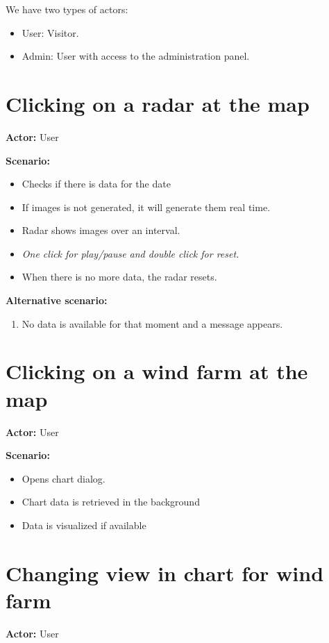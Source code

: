 We have two types of actors:
\begin{itemize}
\item User: Visitor.
\item Admin: User with access to the administration panel.
\end{itemize}

\section{Clicking on a radar at the map}
\textbf{Actor:} User

\textbf{Scenario:}
\begin{itemize}
\item Checks if there is data for the date
\item If images is not generated, it will generate them real time.
\item Radar shows images over an interval.
\item \emph{One click for play/pause and double click for reset.}
\item When there is no more data, the radar resets.
\end{itemize}
\textbf{Alternative scenario:} 
\begin{enumerate}
\item No data is available for that moment and a message appears.
\end{enumerate}

\section{Clicking on a wind farm at the map}
\textbf{Actor:} User

\textbf{Scenario:}
\begin{itemize}
\item Opens chart dialog.
\item Chart data is retrieved in the background
\item Data is visualized if available
\end{itemize}

\section{Changing view in chart for wind farm}
\textbf{Actor:} User

